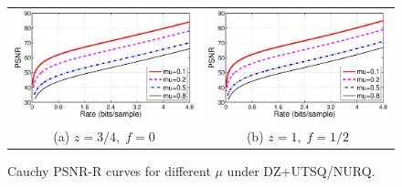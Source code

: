 \documentclass[smallabstract,smallcaptions]{dccpaper}
\begin{document}
\begin{figure}[tp]
\begin{center}
\begin{tabular}{cc}
\includegraphics[width = 0.5\linewidth]{Figures/section3/RD_Cauchy_z=0_75_p=0} &
\includegraphics[width = 0.5\linewidth]{Figures/section3/RD_Cauchy_z=1_p=0_5} \\
{\small (a) $z=3/4,\;f=0$} & {\small (b) $z=1,\;f=1/2$} 
\end{tabular}
\end{center}
\vspace{-20pt}
\caption{\label{fig:RD_mu}
Cauchy PSNR-R curves for different $\mu$ under DZ+UTSQ/NURQ.}
\end{figure} 
\end{document}
